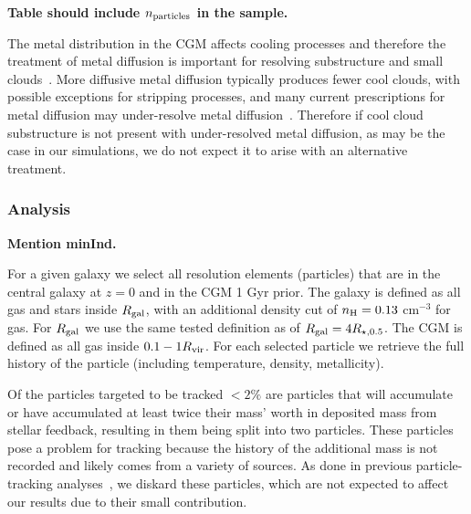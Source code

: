 \documentclass[fleqn,usenatbib]{mnras}
\begin{document}
\textbf{Table should include $n_{\rm particles}$ in the sample.}

The metal distribution in the CGM affects cooling processes and therefore the treatment of metal diffusion is important for resolving substructure and small clouds~\cite{rennehan2021}.
More diffusive metal diffusion typically produces fewer cool clouds, with possible exceptions for stripping processes, and many current prescriptions for metal diffusion may under-resolve metal diffusion~\citep[e.g.][]{rennehan2019, rennehan2021}.
Therefore if cool cloud substructure is not present with under-resolved metal diffusion, as may be the case in our simulations, we do not expect it to arise with an alternative treatment.

\subsubsection{Analysis}
\label{s: methods -- analysis}

\textbf{Mention minInd.}

For a given galaxy we select all resolution elements (particles) that are in the central galaxy at $z=0$ and in the CGM 1 Gyr prior.
The galaxy is defined as all gas and stars inside $R_{\rm gal}$, with an additional density cut of $n_{\rm H} = 0.13$ cm$^{-3}$ for gas.
For $R_{\rm gal}$ we use the same tested definition as \cite{Hafen2019, Hafen2020} of $R_{\rm gal} = 4 R_{\star,0.5}$.
The CGM is defined as all gas inside $0.1 -1 R_{\rm vir}$.
For each selected particle we retrieve the full history of the particle (including temperature, density, metallicity).

Of the particles targeted to be tracked $<2\%$ are particles that will accumulate or have accumulated at least twice their mass' worth in deposited mass from stellar feedback, resulting in them being split into two particles.
These particles pose a problem for tracking because the history of the additional mass is not recorded and likely comes from a variety of sources.
As done in previous particle-tracking analyses~\citep{Hafen2019, Hafen2020}, we diskard these particles, which are not expected to affect our results due to their small contribution.
\end{document}
